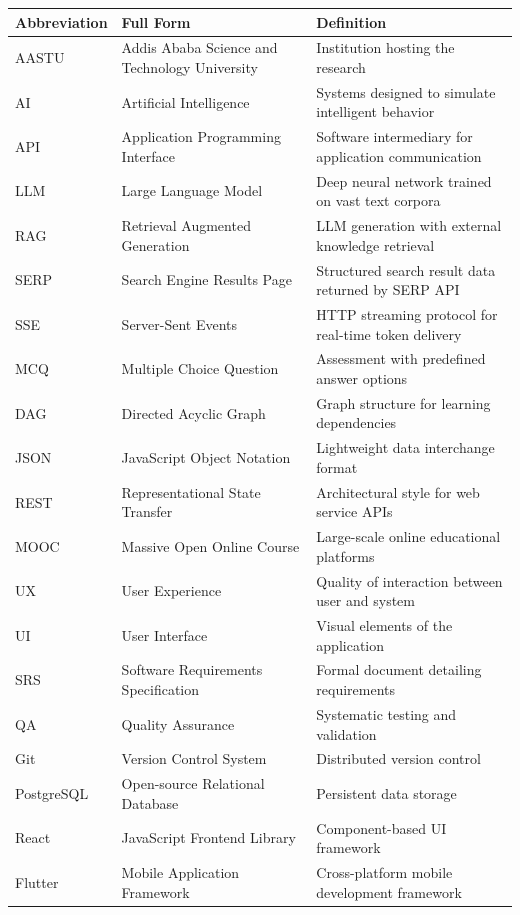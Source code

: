 \documentclass[11pt,a4paper,twoside]{report}
\begin{document}
\begin{longtable}{p{3cm}p{5cm}p{6cm}}
\toprule
\textbf{Abbreviation} & \textbf{Full Form} & \textbf{Definition} \\
\midrule
\endhead
AASTU & Addis Ababa Science and Technology University & Institution hosting the research \\
AI & Artificial Intelligence & Systems designed to simulate intelligent behavior \\
API & Application Programming Interface & Software intermediary for application communication \\
LLM & Large Language Model & Deep neural network trained on vast text corpora \\
RAG & Retrieval Augmented Generation & LLM generation with external knowledge retrieval \\
SERP & Search Engine Results Page & Structured search result data returned by SERP API \\
SSE & Server-Sent Events & HTTP streaming protocol for real-time token delivery \\
MCQ & Multiple Choice Question & Assessment with predefined answer options \\
DAG & Directed Acyclic Graph & Graph structure for learning dependencies \\
JSON & JavaScript Object Notation & Lightweight data interchange format \\
REST & Representational State Transfer & Architectural style for web service APIs \\
MOOC & Massive Open Online Course & Large-scale online educational platforms \\
UX & User Experience & Quality of interaction between user and system \\
UI & User Interface & Visual elements of the application \\
SRS & Software Requirements Specification & Formal document detailing requirements \\
QA & Quality Assurance & Systematic testing and validation \\
Git & Version Control System & Distributed version control \\
PostgreSQL & Open-source Relational Database & Persistent data storage \\
React & JavaScript Frontend Library & Component-based UI framework \\
Flutter & Mobile Application Framework & Cross-platform mobile development framework \\

\end{longtable}
\end{document}
